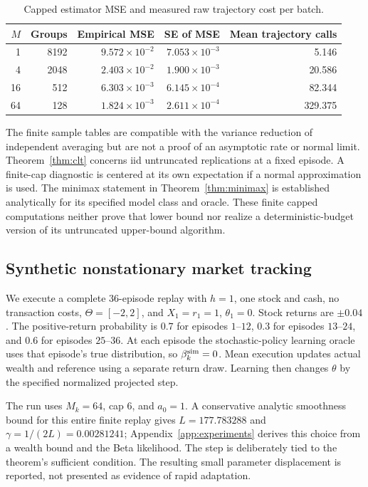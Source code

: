 \documentclass[11pt]{article}
\newcommand{\1}{\mathbf 1}
\theoremstyle{definition}
\begin{document}
\begin{table}[htbp]
\centering\small
\caption{Capped estimator MSE and measured raw trajectory cost per batch.}\label{tab:batch-diagnostics}
\begin{tabular}{rrrrr}
\toprule
$M$ & Groups & Empirical MSE & SE of MSE & Mean trajectory calls\\
\midrule
1 & 8192 & $9.572\times10^{-2}$ & $7.053\times10^{-3}$ & 5.146 \\
4 & 2048 & $2.403\times10^{-2}$ & $1.900\times10^{-3}$ & 20.586 \\
16 & 512 & $6.303\times10^{-3}$ & $6.145\times10^{-4}$ & 82.344 \\
64 & 128 & $1.824\times10^{-3}$ & $2.611\times10^{-4}$ & 329.375 \\
\bottomrule
\end{tabular}
\end{table}

The finite sample tables are compatible with the variance reduction of independent averaging but are not a proof of an asymptotic rate or normal limit. Theorem~\ref{thm:clt} concerns iid untruncated replications at a fixed episode. A finite-cap diagnostic is centered at its own expectation if a normal approximation is used. The minimax statement in Theorem~\ref{thm:minimax} is established analytically for its specified model class and oracle. These finite capped computations neither prove that lower bound nor realize a deterministic-budget version of its untruncated upper-bound algorithm.

\subsection{Synthetic nonstationary market tracking}
We execute a complete $36$-episode replay with $h=1$, one stock and cash, no transaction costs, $\Theta=[-2,2]$, and $X_1=r_1=1$, $\theta_1=0$. Stock returns are $\pm0.04$. The positive-return probability is $0.7$ for episodes $1$--$12$, $0.3$ for episodes $13$--$24$, and $0.6$ for episodes $25$--$36$. At each episode the stochastic-policy learning oracle uses that episode's true distribution, so $\beta_k^{\rm sim}=0$. Mean execution updates actual wealth and reference using a separate return draw. Learning then changes $\theta$ by the specified normalized projected step.

The run uses $M_k=64$, cap $6$, and $a_0=1$. A conservative analytic smoothness bound for this entire finite replay gives $L=177.783288$ and $\gamma=1/(2L)=0.00281241$; Appendix~\ref{app:experiments} derives this choice from a wealth bound and the Beta likelihood. The step is deliberately tied to the theorem's sufficient condition. The resulting small parameter displacement is reported, not presented as evidence of rapid adaptation.
\end{document}

